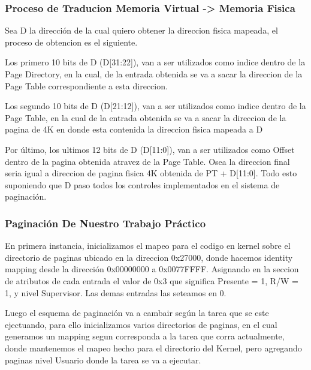 \subsubsection*{Proceso de Traducion Memoria Virtual -> Memoria Fisica}
\par{ Sea D la dirección de la cual quiero obtener la direccion fisica mapeada, el proceso de obtencion es el siguiente.} 
\par {Los primero 10 bits de D (D[31:22]), van a ser utilizados como indice dentro de la Page Directory, en la cual, de la entrada obtenida  se va a sacar la direccion de la Page Table correspondiente a esta direccion.}
\par{ Los segundo 10 bits de D (D[21:12]), van a ser utilizados como indice dentro de la Page Table, en la cual de la entrada obtenida se va a sacar la direccion de la pagina de 4K en donde esta contenida la direccion fisica mapeada a D}
\par{ Por último, los ultimos 12 bits de D (D[11:0]), van a ser utilizados como Offset dentro de la pagina obtenida atravez de la Page Table. Osea la direccion final seria igual a direccion de pagina fisica 4K obtenida de PT + D[11:0]. Todo esto suponiendo que D paso todos los controles implementados en el sistema de paginación.}

\subsubsection*{Paginación De Nuestro Trabajo Práctico}
\par{En primera instancia, inicializamos el mapeo para el codigo en kernel sobre el directorio de paginas ubicado en la direccion 0x27000, donde hacemos identity mapping desde la dirección 0x00000000 a 0x0077FFFF. Asignando en la seccion de atributos de cada entrada el valor de 0x3 que significa Presente = 1, R/W = 1, y nivel Supervisor. Las demas entradas las seteamos en 0.}
\par{Luego el esquema de paginación va a cambair según la tarea que se este ejectuando, para ello inicializamos varios directorios de paginas, en el cual generamos un mapping segun corresponda a la tarea que corra actualmente, donde mantenemos el mapeo hecho para el directorio del Kernel, pero agregando paginas nivel Usuario donde la tarea se va a ejecutar.}



